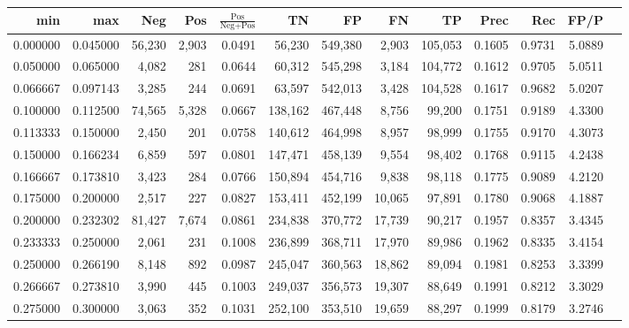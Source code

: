 \begin{tabular}{rrrrrrrrrrrrr}
\toprule
     min &      max &    Neg &    Pos & $\frac{\text{Pos}}{\text{Neg}+\text{Pos}}$ &      TN &      FP &      FN &      TP &   Prec &    Rec &   FP/P \\
\midrule
0.000000 & 0.045000 & 56,230 &  2,903 &                                     0.0491 &  56,230 & 549,380 &   2,903 & 105,053 & 0.1605 & 0.9731 & 5.0889 \\
0.050000 & 0.065000 &  4,082 &    281 &                                     0.0644 &  60,312 & 545,298 &   3,184 & 104,772 & 0.1612 & 0.9705 & 5.0511 \\
0.066667 & 0.097143 &  3,285 &    244 &                                     0.0691 &  63,597 & 542,013 &   3,428 & 104,528 & 0.1617 & 0.9682 & 5.0207 \\
0.100000 & 0.112500 & 74,565 &  5,328 &                                     0.0667 & 138,162 & 467,448 &   8,756 &  99,200 & 0.1751 & 0.9189 & 4.3300 \\
0.113333 & 0.150000 &  2,450 &    201 &                                     0.0758 & 140,612 & 464,998 &   8,957 &  98,999 & 0.1755 & 0.9170 & 4.3073 \\
0.150000 & 0.166234 &  6,859 &    597 &                                     0.0801 & 147,471 & 458,139 &   9,554 &  98,402 & 0.1768 & 0.9115 & 4.2438 \\
0.166667 & 0.173810 &  3,423 &    284 &                                     0.0766 & 150,894 & 454,716 &   9,838 &  98,118 & 0.1775 & 0.9089 & 4.2120 \\
0.175000 & 0.200000 &  2,517 &    227 &                                     0.0827 & 153,411 & 452,199 &  10,065 &  97,891 & 0.1780 & 0.9068 & 4.1887 \\
0.200000 & 0.232302 & 81,427 &  7,674 &                                     0.0861 & 234,838 & 370,772 &  17,739 &  90,217 & 0.1957 & 0.8357 & 3.4345 \\
0.233333 & 0.250000 &  2,061 &    231 &                                     0.1008 & 236,899 & 368,711 &  17,970 &  89,986 & 0.1962 & 0.8335 & 3.4154 \\
0.250000 & 0.266190 &  8,148 &    892 &                                     0.0987 & 245,047 & 360,563 &  18,862 &  89,094 & 0.1981 & 0.8253 & 3.3399 \\
0.266667 & 0.273810 &  3,990 &    445 &                                     0.1003 & 249,037 & 356,573 &  19,307 &  88,649 & 0.1991 & 0.8212 & 3.3029 \\
0.275000 & 0.300000 &  3,063 &    352 &                                     0.1031 & 252,100 & 353,510 &  19,659 &  88,297 & 0.1999 & 0.8179 & 3.2746 \\

\end{tabular}
